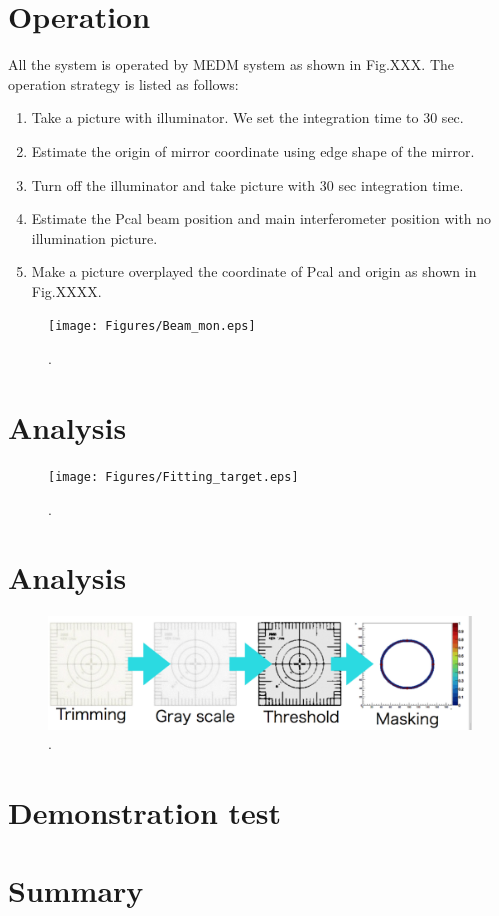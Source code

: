 \section{Operation}
All the system is operated by MEDM system as shown in Fig.XXX.
The operation strategy is listed as follows:
\begin{enumerate}
 \item Take a picture with illuminator. We set the integration time to 30 sec.
 \item Estimate the origin of mirror coordinate using edge shape of the mirror.
 \item Turn off the illuminator and take picture with 30 sec integration time.
  \item Estimate the Pcal beam position and main interferometer position with no illumination picture.
   \item Make a picture overplayed the coordinate of Pcal and origin as shown in Fig.XXXX.
   \end{enumerate}
   \begin{figure}
\begin{center}
\texttt{[image: Figures/Beam\_mon.eps]}
\caption{.} 
\label{fig:Beam_mon} 
\end{center}
\end{figure}


\section{Analysis}
   \begin{figure}
\begin{center}
\texttt{[image: Figures/Fitting\_target.eps]}
\caption{.} 
\label{fig:Fitting_target} 
\end{center}
\end{figure}
   

\section{Analysis}
   \begin{figure}
\begin{center}
\includegraphics[width=14cm]{Figures/Analysis_cam.eps}
\caption{.} 
\label{fig:Analysis_cam} 
\end{center}
\end{figure}
\section{Demonstration test}
\section{Summary}

 